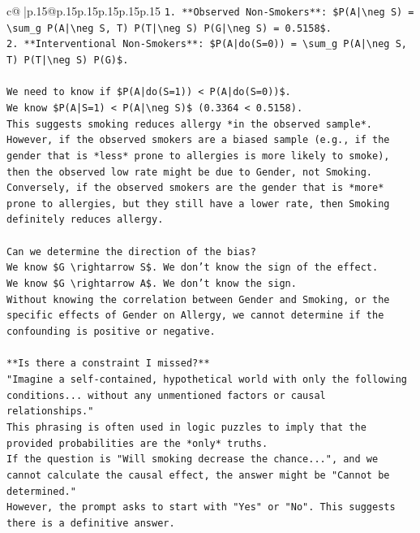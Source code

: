 \documentclass{article}
\begin{document}
{\begin{supertabular}{c@{$\;$}|p{.15\linewidth}@{}p{.15\linewidth}p{.15\linewidth}p{.15\linewidth}p{.15\linewidth}p{.15\linewidth}}
{{{\texttt{1.  **Observed Non{-}Smokers**: \$P(A|\textbackslash{}neg S) = \textbackslash{}sum\_g P(A|\textbackslash{}neg S, T) P(T|\textbackslash{}neg S) P(G|\textbackslash{}neg S) = 0.5158\$.} \\
\texttt{2.  **Interventional Non{-}Smokers**: \$P(A|do(S=0)) = \textbackslash{}sum\_g P(A|\textbackslash{}neg S, T) P(T|\textbackslash{}neg S) P(G)\$.} \\
\\ 
\texttt{We need to know if \$P(A|do(S=1)) < P(A|do(S=0))\$.} \\
\texttt{We know \$P(A|S=1) < P(A|\textbackslash{}neg S)\$ (0.3364 < 0.5158).} \\
\texttt{This suggests smoking reduces allergy *in the observed sample*.} \\
\texttt{However, if the observed smokers are a biased sample (e.g., if the gender that is *less* prone to allergies is more likely to smoke), then the observed low rate might be due to Gender, not Smoking.} \\
\texttt{Conversely, if the observed smokers are the gender that is *more* prone to allergies, but they still have a lower rate, then Smoking definitely reduces allergy.} \\
\\ 
\texttt{Can we determine the direction of the bias?} \\
\texttt{We know \$G \textbackslash{}rightarrow S\$. We don't know the sign of the effect.} \\
\texttt{We know \$G \textbackslash{}rightarrow A\$. We don't know the sign.} \\
\texttt{Without knowing the correlation between Gender and Smoking, or the specific effects of Gender on Allergy, we cannot determine if the confounding is positive or negative.} \\
\\ 
\texttt{**Is there a constraint I missed?**} \\
\texttt{"Imagine a self{-}contained, hypothetical world with only the following conditions... without any unmentioned factors or causal relationships."} \\
\texttt{This phrasing is often used in logic puzzles to imply that the provided probabilities are the *only* truths.} \\
\texttt{If the question is "Will smoking decrease the chance...", and we cannot calculate the causal effect, the answer might be "Cannot be determined."} \\
\texttt{However, the prompt asks to start with "Yes" or "No". This suggests there is a definitive answer.} \\
}}}
\end{supertabular}}
\end{document}
